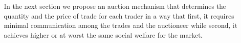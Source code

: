 







In the next section we propose an auction mechanism that determines the quantity and the price of trade for each trader in a way that first, it requires minimal communication among the trades and the auctioneer while second, it achieves higher or at worst the same social welfare for the market.


